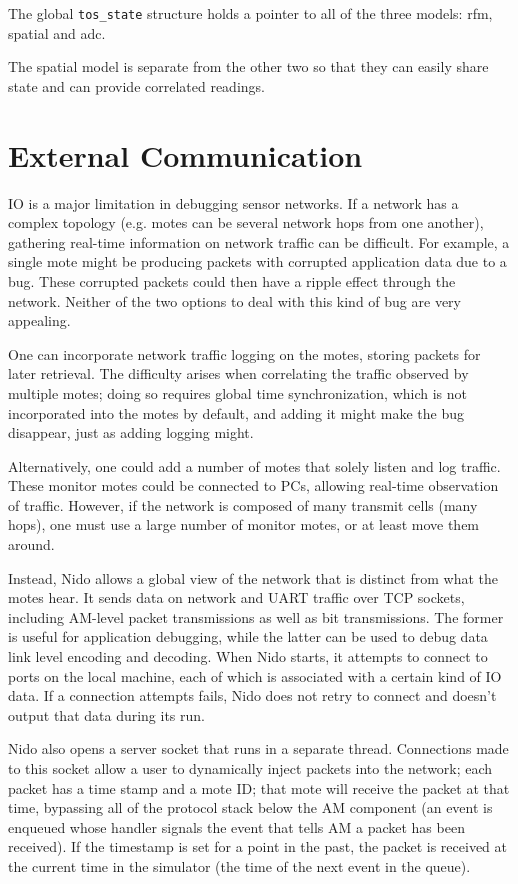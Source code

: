 \documentclass[10pt]{article}
\begin{document}
The global {\tt tos\_state} structure holds a pointer to all of the
three models: rfm, spatial and adc.

The spatial model is separate from the other two so that they can
easily share state and can provide correlated readings.

\section*{External Communication}

IO is a major limitation in debugging sensor networks. If a network
has a complex topology (e.g. motes can be several network hops from
one another), gathering real-time information on network traffic can
be difficult. For example, a single mote might be producing packets
with corrupted application data due to a bug. These corrupted packets
could then have a ripple effect through the network. Neither of the
two options to deal with this kind of bug are very appealing.

One can incorporate network traffic logging on the motes, storing
packets for later retrieval. The difficulty arises when correlating
the traffic observed by multiple motes; doing so requires global time
synchronization, which is not incorporated into the motes by default,
and adding it might make the bug disappear, just as adding logging might. 

Alternatively, one could add a number of motes that solely listen and
log traffic. These monitor motes could be connected to PCs, allowing
real-time observation of traffic. However, if the network is composed
of many transmit cells (many hops), one must use a large number of
monitor motes, or at least move them around.

Instead, Nido allows a global view of the network that is distinct
from what the motes hear. It sends data on network and UART traffic
over TCP sockets, including AM-level packet transmissions as well as
bit transmissions. The former is useful for application debugging,
while the latter can be used to debug data link level encoding and
decoding. When Nido starts, it attempts to connect to ports on the
local machine, each of which is associated with a certain kind of IO
data. If a connection attempts fails, Nido does not retry to connect
and doesn't output that data during its run.

Nido also opens a server socket that runs in a separate
thread. Connections made to this socket allow a user to dynamically
inject packets into the network; each packet has a time stamp and a
mote ID; that mote will receive the packet at that time, bypassing all
of the protocol stack below the AM component (an event is enqueued
whose handler signals the event that tells AM a packet has been
received). If the timestamp is set for a point in the past, the packet
is received at the current time in the simulator (the time of the next
event in the queue).
\end{document}
